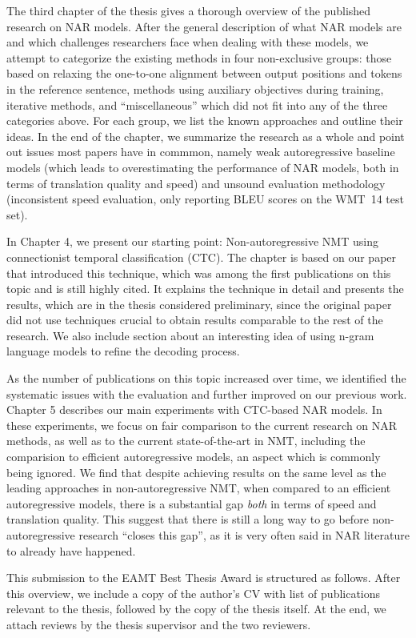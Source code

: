 \documentclass[12pt,a4paper]{article}
\begin{document}
The third chapter of the thesis gives a thorough overview of the published
research on NAR models. After the general description of what NAR models are
and which challenges researchers face when dealing with these models, we
attempt to categorize the existing methods in four non-exclusive groups: those
based on relaxing the one-to-one alignment between output positions and tokens
in the reference sentence, methods using auxiliary objectives during training,
iterative methods, and ``miscellaneous'' which did not fit into any of the
three categories above. For each group, we list the known approaches and
outline their ideas. In the end of the chapter, we summarize the research as a
whole and point out issues most papers have in commmon, namely weak
autoregressive baseline models (which leads to overestimating the performance
of NAR models, both in terms of translation quality and speed) and unsound
evaluation methodology (inconsistent speed evaluation, only reporting BLEU
scores on the WMT~14 test set).

In Chapter 4, we present our starting point: Non-autoregressive NMT using
connectionist temporal classification (CTC). The chapter is based on our paper
that introduced this technique, which was among the first publications on this
topic and is still highly cited. It explains the technique in detail and
presents the results, which are in the thesis considered preliminary, since the
original paper did not use techniques crucial to obtain results comparable to
the rest of the research. We also include section about an interesting idea of
using n-gram language models to refine the decoding process.

As the number of publications on this topic increased over time, we identified
the systematic issues with the evaluation and further improved on our previous
work. Chapter 5 describes our main experiments with CTC-based NAR models. In
these experiments, we focus on fair comparison to the current research on NAR
methods, as well as to the current state-of-the-art in NMT, including the
comparision to efficient autoregressive models, an aspect which is commonly
being ignored. We find that despite achieving results on the same level as the
leading approaches in non-autoregressive NMT, when compared to an efficient
autoregressive models, there is a substantial gap \emph{both} in terms of speed
and translation quality. This suggest that there is still a long way to go
before non-autoregressive research ``closes this gap'', as it is very often
said in NAR literature to already have happened.

This submission to the EAMT Best Thesis Award is structured as follows. After
this overview, we include a copy of the author's CV with list of publications
relevant to the thesis, followed by the copy of the thesis itself. At the end,
we attach reviews by the thesis supervisor and the two reviewers.
\end{document}

